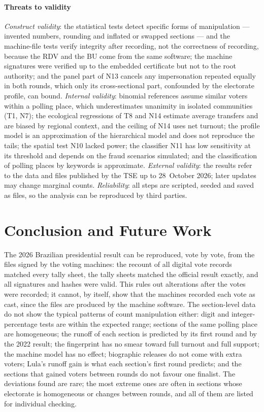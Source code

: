 \documentclass[fleqn,10pt]{SelfArx}
\begin{document}
\paragraph{Threats to validity}
\emph{Construct validity}: the statistical tests detect specific forms of
manipulation --- invented numbers, rounding and inflated or swapped
sections --- and the machine-file tests verify integrity after recording,
not the correctness of recording, because the RDV and the BU come from the
same software; the machine signatures were verified up to the embedded
certificate but not to the root authority; and the panel part of N13 cancels
any impersonation repeated equally in both rounds, which only its
cross-sectional part, confounded by the electorate profile, can bound.
\emph{Internal validity}: binomial references assume similar voters within a
polling place, which underestimates unanimity in isolated communities (T1,
N7); the ecological regressions of T8 and N14 estimate average transfers and
are biased by regional context, and the ceiling of N14 uses net turnout; the
profile model is an approximation of the hierarchical model and does not
reproduce the tails; the spatial test N10 lacked power; the classifier N11
has low sensitivity at its threshold and depends on the fraud scenarios
simulated; and the classification of polling places by keywords is
approximate. \emph{External validity}: the results refer to the data and
files published by the TSE up to 28~October 2026; later updates may change
marginal counts. \emph{Reliability}: all steps are scripted, seeded and
saved as files, so the analysis can be reproduced by third parties.

\section{Conclusion and Future Work}
\label{sec:conc}

The 2026 Brazilian presidential result can be reproduced, vote by vote, from
the files signed by the voting machines: the recount of all digital vote
records matched every tally sheet, the tally sheets matched the official
result exactly, and all signatures and hashes were valid. This rules out
alterations after the votes were recorded; it cannot, by itself, show that
the machines recorded each vote as cast, since the files are produced by the
machine software. The section-level
data do not show the typical patterns of count manipulation either: digit
and integer-percentage tests are within the expected range; sections of the
same polling place are homogeneous; the runoff of each section is predicted
by its first round and by the 2022 result; the fingerprint has no smear
toward full turnout and full support; the machine model has no effect;
biographic releases do not come with extra voters; Lula's runoff gain is
what each section's first round predicts; and
the sections that gained voters between rounds do not favour one finalist.
The deviations found are rare; the most extreme ones are often in sections
whose electorate is homogeneous or changes between rounds, and all of them
are listed for individual checking.
\end{document}
